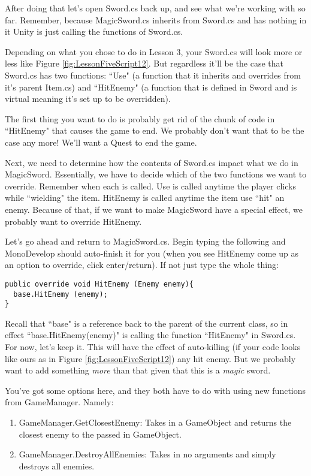 \documentclass{article}
\begin{document}
After doing that let's open Sword.cs back up, and see what we're working with so far. Remember, because MagicSword.cs inherits from Sword.cs and has nothing in it Unity is just calling the functions of Sword.cs.

Depending on what you chose to do in Lesson 3, your Sword.cs will look more or less like Figure \ref{fig:LessonFiveScript12}. But regardless it'll be the case that Sword.cs has two functions: ``Use" (a function that it inherits and overrides from it's parent Item.cs) and ``HitEnemy" (a function that is defined in Sword and is virtual meaning it's set up to be overridden). 

The first thing you want to do is probably get rid of the chunk of code in ``HitEnemy" that causes the game to end. We probably don't want that to be the case any more! We'll want a Quest to end the game. 

Next, we need to determine how the contents of Sword.cs impact what we do in MagicSword. Essentially, we have to decide which of the two functions we want to override. Remember when each is called. Use is called anytime the player clicks while ``wielding" the item. HitEnemy is called anytime the item use ``hit" an enemy. Because of that, if we want to make MagicSword have a special effect, we probably want to override HitEnemy. 

Let's go ahead and return to MagicSword.cs. Begin typing the following and MonoDevelop should auto-finish it for you (when you see HitEnemy come up as an option to override, click enter/return). If not just type the whole thing: 

\lstset{style=sharpc}
\begin{lstlisting}
public override void HitEnemy (Enemy enemy){
  base.HitEnemy (enemy);
}
\end{lstlisting}

Recall that ``base" is a reference back to the parent of the current class, so in effect ``base.HitEnemy(enemy)" is calling the function ``HitEnemy" in Sword.cs. For now, let's keep it. This will have the effect of auto-killing (if your code looks like ours as in Figure \ref{fig:LessonFiveScript12}) any hit enemy. But we probably want to add something \textit{more} than that given that this is a \textit{magic} sword. 

You've got some options here, and they both have to do with using new functions from GameManager. Namely: 

\begin{enumerate}
 \item GameManager.GetClosestEnemy: Takes in a GameObject and returns the closest enemy to the passed in GameObject.
 \item GameManager.DestroyAllEnemies: Takes in no arguments and simply destroys all enemies. 
\end{enumerate}
\end{document}
